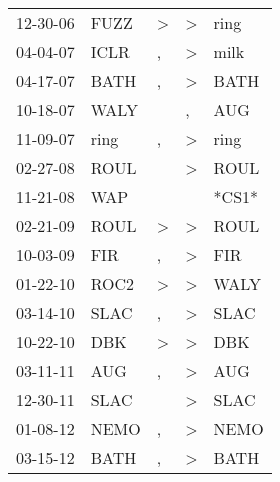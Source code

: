 \begin{supertabular}{p{0.07\textwidth}p{0.06\textwidth}p{0.02\textwidth}p{0.02\textwidth}p{0.06\textwidth}}
 12-30-06\textsuperscript{} &  FUZZ\textsuperscript{} &  \textgreater &     \textgreater &           ring\textsuperscript{} \\
 04-04-07\textsuperscript{} &  ICLR\textsuperscript{} &             , &     \textgreater &           milk\textsuperscript{} \\
 04-17-07\textsuperscript{} &  BATH\textsuperscript{} &             , &     \textgreater &           BATH\textsuperscript{} \\
 10-18-07\textsuperscript{} &  WALY\textsuperscript{} &               &                , &            AUG\textsuperscript{} \\
 11-09-07\textsuperscript{} &  ring\textsuperscript{} &             , &     \textgreater &           ring\textsuperscript{} \\
 02-27-08\textsuperscript{} &  ROUL\textsuperscript{} &               &     \textgreater &           ROUL\textsuperscript{} \\
 11-21-08\textsuperscript{} &   WAP\textsuperscript{} &               &                  &                            *CS1* \\
 02-21-09\textsuperscript{} &  ROUL\textsuperscript{} &  \textgreater &     \textgreater &           ROUL\textsuperscript{} \\
 10-03-09\textsuperscript{} &   FIR\textsuperscript{} &             , &     \textgreater &            FIR\textsuperscript{} \\
 01-22-10\textsuperscript{} &  ROC2\textsuperscript{} &  \textgreater &     \textgreater &           WALY\textsuperscript{} \\
 03-14-10\textsuperscript{} &  SLAC\textsuperscript{} &             , &     \textgreater &           SLAC\textsuperscript{} \\
 10-22-10\textsuperscript{} &   DBK\textsuperscript{} &  \textgreater &     \textgreater &            DBK\textsuperscript{} \\
 03-11-11\textsuperscript{} &   AUG\textsuperscript{} &             , &     \textgreater &            AUG\textsuperscript{} \\
 12-30-11\textsuperscript{} &  SLAC\textsuperscript{} &               &     \textgreater &           SLAC\textsuperscript{} \\
 01-08-12\textsuperscript{} &  NEMO\textsuperscript{} &             , &     \textgreater &           NEMO\textsuperscript{} \\
 03-15-12\textsuperscript{} &  BATH\textsuperscript{} &             , &     \textgreater &           BATH\textsuperscript{} \\

\end{supertabular}
